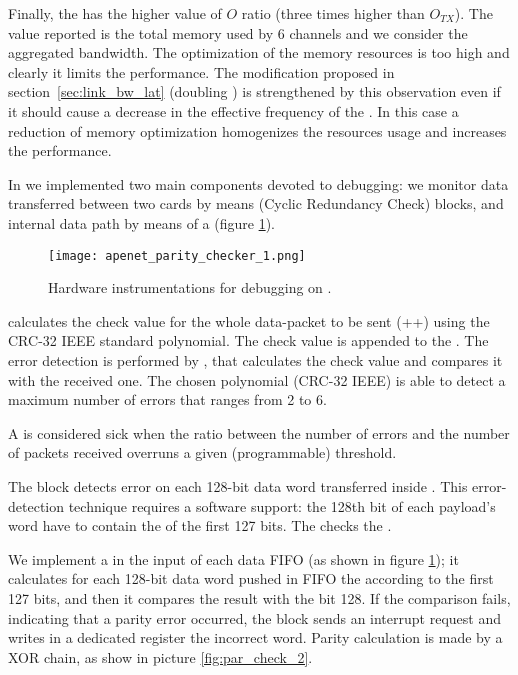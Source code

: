 Finally, the  has the higher value of $O$ ratio (three
times higher than $O_{TX}$). The value reported is the total memory
used by 6 channels and we consider the aggregated bandwidth. The
optimization of the memory resources is too high and clearly it limits
the  performance.
The modification proposed in section~\ref{sec:link_bw_lat} (doubling
) is strengthened by this observation even if it
should cause a decrease in the effective frequency of the . In this case a reduction of memory optimization homogenizes the
resources usage and increases the performance.
   


In \apenetp we implemented two main components devoted to debugging:
we monitor data transferred between two \apenetp cards by means
 (Cyclic Redundancy Check) blocks, and internal data path by
means of a  (figure \ref{fig:par_check_1}).

\begin{figure}[!hbt]
  \centering
  \texttt{[image: apenet\_parity\_checker\_1.png]}
  \caption{Hardware instrumentations for debugging on \apenetp.
}
  \label{fig:par_check_1}
\end{figure}


 calculates the check value for the whole data-packet to
be sent (++) using the CRC-32 IEEE
standard polynomial. The check value is appended to the \footer.
The error detection is performed by , that calculates the
check value and compares it with the received one. The chosen
polynomial (CRC-32 IEEE) is able to detect a maximum number of errors
that ranges from 2 to 6.


A  is considered sick when the ratio between the number
of errors and the number of packets received overruns a given
(programmable) threshold.



The  block detects error on each 128-bit data
word transferred inside \apenetp. This error-detection technique
requires a software support: the 128th bit of each payload's word have
to contain the  of the first 127 bits. The  checks the .

We implement a  in the input of each data FIFO
(as shown in figure \ref{fig:par_check_1}); it calculates for each
128-bit data word pushed in FIFO the  according to the
first 127 bits, and then it compares the result with the bit 128.  If
the comparison fails, indicating that a parity error occurred, the
block sends an interrupt request and writes in a dedicated register
the incorrect word. Parity calculation is made by a XOR chain, as show
in picture \ref{fig:par_check_2}.

